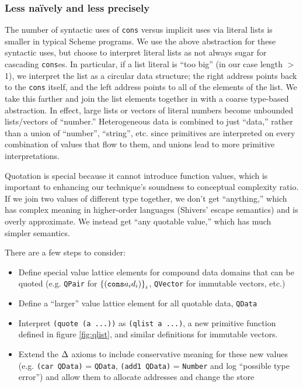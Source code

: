 \documentclass[preprint,onecolumn,9pt]{sigplanconf} %
\newcommand{\naively}{ na\"ively}
\begin{document}
\subsubsection{Less \naively{} and less precisely}

The number of syntactic uses of {\tt cons} versus implicit uses via
literal lists is smaller in typical Scheme programs. We use the above
abstraction for these syntactic uses, but choose to interpret literal
lists as not always sugar for cascading {\tt cons}es. In particular,
if a list literal is ``too big'' (in our case length $>$ 1), we
interpret the list as a circular data structure; the right address
points back to the {\tt cons} itself, and the left address points to
all of the elements of the list. We take this farther and join the
list elements together in with a coarse type-based abstraction. In
effect, large lists or vectors of literal numbers become unbounded
lists/vectors of ``number.'' Heterogeneous data is combined to just
``data,'' rather than a union of ``number'', ``string'', etc. since
primitives are interpreted on every combination of values that flow to
them, and unions lead to more primitive interpretations.

Quotation is special because it cannot introduce function values,
which is important to enhancing our technique's soundness to
conceptual complexity ratio. If we join two values of different type
together, we don't get ``anything,'' which has complex meaning in
higher-order languages (Shivers' escape semantics) and is overly
approximate. We instead get ``any quotable value,'' which has much
simpler semantics.

There are a few steps to consider:
\begin{itemize}
 \item{Define special value lattice elements for compound data domains that can be quoted
       (e.g. {\tt QPair} for $\left\{ ({\tt cons} a_i d_i)\right\}_i$, {\tt QVector} for immutable vectors, etc.)}
 \item{Define a ``larger'' value lattice element for all quotable data, {\tt QData}}
 \item{Interpret {\tt (quote (a ...))} as {\tt (qlist a ...)}, a new primitive function defined in figure \ref{fig:qlist},
       and similar definitions for immutable vectors.}
 \item{Extend the $\Delta$ axioms to include conservative
   meaning for these new values (e.g. {\tt (car QData)} = {\tt QData},
   {\tt (add1 QData)} = {\tt Number} and log ``possible type error'')
   and allow them to allocate addresses and change the store}
\end{itemize}
\end{document}
